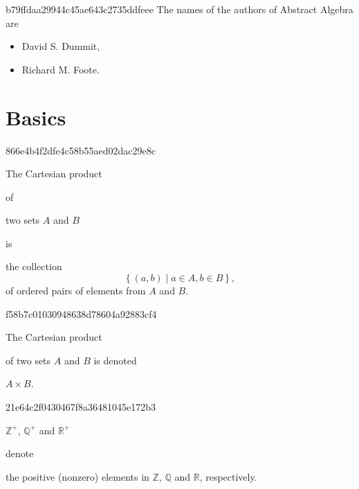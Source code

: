 


\begin{note}{b79ffdaa29944c45ae643c2735ddfeee}
    The names of the authors of Abstract Algebra are
    \begin{itemize}
        \item{} \begin{icloze}{1}David S. Dummit,\end{icloze}
        \item{} \begin{icloze}{2}Richard M. Foote.\end{icloze}
    \end{itemize}
\end{note}

\section{Basics}
\begin{note}{866e4b4f2dfe4c58b55aed02dac29e8c}
    \begin{icloze}{2}The Cartesian product\end{icloze} of \begin{icloze}{3}two sets \({ A }\) and \({ B }\)\end{icloze} is
    \begin{icloze}{1}
        the collection
        \[
            \left\{ (a, b) \mid a \in A, b \in B \right\},
        \]
        of ordered pairs of elements from \({ A }\) and \({ B }\).
    \end{icloze}
\end{note}

\begin{note}{f58b7c01030948638d78604a92883cf4}
    \begin{icloze}{2}The Cartesian product\end{icloze} of two sets \({ A }\) and \({ B }\) is denoted \begin{icloze}{1}\({ A \times B }\).\end{icloze}
\end{note}

\begin{note}{21e64c2f0430467f8a36481045e172b3}
    \begin{icloze}{2}\({ \mathbb Z^{+} }\), \({ \mathbb Q^{+} }\) and \({ \mathbb R^{+} }\)\end{icloze} denote \begin{icloze}{1}the positive (nonzero) elements in \({ \mathbb Z }\), \({ \mathbb Q }\) and \({ \mathbb R }\), respectively.\end{icloze}
\end{note}

